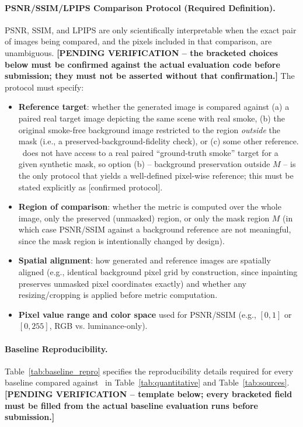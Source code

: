 \documentclass[journal]{IEEEtran}
\begin{document}
\paragraph{PSNR/SSIM/LPIPS Comparison Protocol (Required Definition).}
\label{sec:psnr_protocol}
PSNR, SSIM, and LPIPS are only scientifically interpretable when the exact
pair of images being compared, and the pixels included in that comparison,
are unambiguous. \textbf{[PENDING VERIFICATION -- the bracketed choices
below must be confirmed against the actual evaluation code before
submission; they must not be asserted without that confirmation.]} The
protocol must specify:
\begin{itemize}
    \item \textbf{Reference target}: whether the generated image is
    compared against (a) a paired real target image depicting the same
    scene with real smoke, (b) the original smoke-free background image
    restricted to the region \emph{outside} the mask (i.e., a
    preserved-background-fidelity check), or (c) some other reference.
    \method~does not have access to a real paired ``ground-truth smoke''
    target for a given synthetic mask, so option (b) -- background
    preservation outside $M$ -- is the only protocol that yields a
    well-defined pixel-wise reference; this must be stated explicitly as
    [confirmed protocol].
    \item \textbf{Region of comparison}: whether the metric is computed
    over the whole image, only the preserved (unmasked) region, or only
    the mask region $M$ (in which case PSNR/SSIM against a background
    reference are not meaningful, since the mask region is intentionally
    changed by design).
    \item \textbf{Spatial alignment}: how generated and reference images
    are spatially aligned (e.g., identical background pixel grid by
    construction, since inpainting preserves unmasked pixel coordinates
    exactly) and whether any resizing/cropping is applied before metric
    computation.
    \item \textbf{Pixel value range and color space} used for PSNR/SSIM
    (e.g., $[0,1]$ or $[0,255]$, RGB vs. luminance-only).
\end{itemize}

\paragraph{Baseline Reproducibility.}
\label{sec:baseline_repro}
Table~\ref{tab:baseline_repro} specifies the reproducibility details
required for every baseline compared against \method~in
Table~\ref{tab:quantitative} and Table~\ref{tab:sources}.
\textbf{[PENDING VERIFICATION -- template below; every bracketed field
must be filled from the actual baseline evaluation runs before
submission.]}
\end{document}
